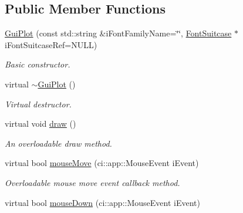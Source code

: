 \subsection*{Public Member Functions}
\begin{DoxyCompactItemize}
\item 
\hypertarget{class_gui_plot_a2498a68711d55cf7f368751f4607d64b}{\hyperlink{class_gui_plot_a2498a68711d55cf7f368751f4607d64b}{Gui\-Plot} (const std\-::string \&i\-Font\-Family\-Name=\char`\"{}\char`\"{}, \hyperlink{class_font_suitcase}{Font\-Suitcase} $\ast$i\-Font\-Suitcase\-Ref=N\-U\-L\-L)}\label{class_gui_plot_a2498a68711d55cf7f368751f4607d64b}

\begin{DoxyCompactList}\small\item\em Basic constructor. \end{DoxyCompactList}\item 
\hypertarget{class_gui_plot_ab27d0193bfdc446bb0602ed5643b4559}{virtual \hyperlink{class_gui_plot_ab27d0193bfdc446bb0602ed5643b4559}{$\sim$\-Gui\-Plot} ()}\label{class_gui_plot_ab27d0193bfdc446bb0602ed5643b4559}

\begin{DoxyCompactList}\small\item\em Virtual destructor. \end{DoxyCompactList}\item 
\hypertarget{class_gui_plot_a9934bd4298d6b193ceb383e885e799b0}{virtual void \hyperlink{class_gui_plot_a9934bd4298d6b193ceb383e885e799b0}{draw} ()}\label{class_gui_plot_a9934bd4298d6b193ceb383e885e799b0}

\begin{DoxyCompactList}\small\item\em An overloadable draw method. \end{DoxyCompactList}\item 
\hypertarget{class_gui_plot_a1ada61adcf5a6822789d64d498d4db53}{virtual bool \hyperlink{class_gui_plot_a1ada61adcf5a6822789d64d498d4db53}{mouse\-Move} (ci\-::app\-::\-Mouse\-Event i\-Event)}\label{class_gui_plot_a1ada61adcf5a6822789d64d498d4db53}

\begin{DoxyCompactList}\small\item\em Overloadable mouse move event callback method. \end{DoxyCompactList}\item 
\hypertarget{class_gui_plot_a662400c9664d5db58a9a0fff20a86724}{virtual bool \hyperlink{class_gui_plot_a662400c9664d5db58a9a0fff20a86724}{mouse\-Down} (ci\-::app\-::\-Mouse\-Event i\-Event)}\label{class_gui_plot_a662400c9664d5db58a9a0fff20a86724}


\end{DoxyCompactItemize}
